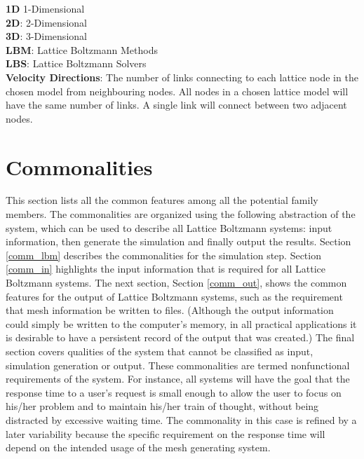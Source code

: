\documentclass[12pt]{article}
\begin{document}
\noindent\textbf{1D} 1-Dimensional\\

\noindent\textbf{2D}: 2-Dimensional\\

\noindent\textbf{3D}: 3-Dimensional\\
 
\noindent\textbf{LBM}: Lattice Boltzmann Methods\\

\noindent\textbf{LBS}: Lattice Boltzmann Solvers\\

\noindent\textbf{Velocity Directions}: The number of links connecting to each lattice node in the chosen model from neighbouring nodes. All nodes in a chosen lattice model will have the same number of links. A single link will connect between two adjacent nodes.
	

\newpage
\section{Commonalities}\label{comm_sec}

This section lists all the common features among all the potential family members. The commonalities are organized using the following abstraction of the system, which can be used to describe all Lattice Boltzmann systems: input information, then generate the simulation and finally output the results. Section \ref{comm_lbm} describes the commonalities for the simulation step. Section \ref{comm_in} highlights the input information that is required for all Lattice Boltzmann systems. The next section, Section \ref{comm_out}, shows the common features for the output of Lattice Boltzmann systems, such as the requirement that mesh information be written to files. (Although the output information could simply be written to the computer’s memory, in all practical applications it is desirable to have a persistent record of the output that was created.) The final section covers qualities of the system that cannot be classified as input, simulation generation or output. These commonalities are termed nonfunctional requirements of the system. For instance, all systems will have the goal that the response time to a user’s request is small enough to allow the user to focus on his/her problem and to maintain his/her train of thought, without being distracted by excessive waiting time. The commonality in this case is refined by a later variability because the specific requirement on the response time will depend on the intended usage of the mesh generating system. 
\end{document}
